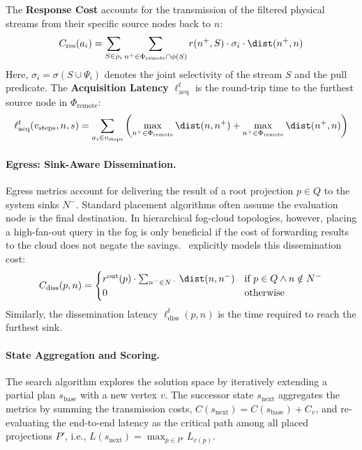 The \textbf{Response Cost} accounts for the transmission of the filtered physical streams from their specific source nodes back to $n$:
\begin{equation}
    C_{\text{res}}(a_i) = \sum_{S \in \rho_i} \sum_{n^+ \in \Phi_{\text{remote}} \cap \phi(S)} r(n^+, S) \cdot \sigma_i \cdot \dist(n^+, n)
\end{equation}
Here, $\sigma_i = \sigma(S \cup \Psi_i)$ denotes the joint selectivity of the stream $S$ and the pull predicate.
The \textbf{Acquisition Latency} $\ell^t_{\text{acq}}$ is the round-trip time to the furthest source node in $\Phi_{\text{remote}}$:
\begin{equation}
    \ell^t_{\text{acq}}(v_{\text{steps}}, n, s) = \sum_{a_i \in v_{\text{steps}}} \left(
        \max_{n^+ \in \Phi_{\text{remote}}} \dist(n, n^+) + \max_{n^+ \in \Phi_{\text{remote}}} \dist(n^+, n)
    \right)
\end{equation}

\paragraph{Egress: Sink-Aware Dissemination.}
Egress metrics account for delivering the result of a root projection $p \in Q$ to the system sinks $N^-$.
Standard placement algorithms often assume the evaluation node is the final destination. In hierarchical fog-cloud topologies, however, placing a high-fan-out query in the fog is only beneficial if the cost of forwarding results to the cloud does not negate the savings.
\we\ explicitly models this dissemination cost:
\begin{equation}
    C_{\text{diss}}(p, n) =
    \begin{cases}
        r^{\text{out}}(p) \cdot \sum_{n^- \in N^-} \dist(n, n^-) & \text{if } p \in Q \wedge n \notin N^- \\
        0 & \text{otherwise}
    \end{cases}
\end{equation}
Similarly, the dissemination latency $\ell^t_{\text{diss}}(p, n)$ is the time required to reach the furthest sink.

\paragraph{State Aggregation and Scoring.}
The search algorithm explores the solution space by iteratively extending a partial plan $s_{\text{base}}$ with a new vertex $v$.
The successor state $s_{\text{next}}$ aggregates the metrics by summing the transmission costs, $C(s_{\text{next}}) = C(s_{\text{base}}) + C_v$, and re-evaluating the end-to-end latency as the critical path among all placed projections $P'$, i.e., $L(s_{\text{next}}) = \max_{p \in P'} L_{v(p)}$.

